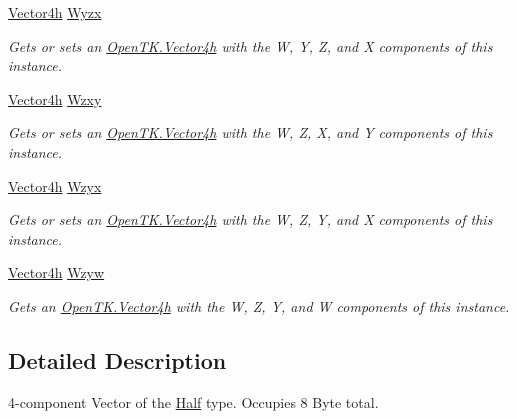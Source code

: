 \begin{DoxyCompactItemize}
\hyperlink{struct_open_t_k_1_1_vector4h}{Vector4h} \hyperlink{struct_open_t_k_1_1_vector4h_a5cd2ba9a5b9fa265e988c7e1f6c35001}{Wyzx}
\begin{DoxyCompactList}\small\item\em Gets or sets an \hyperlink{struct_open_t_k_1_1_vector4h}{Open\-T\-K.\-Vector4h} with the W, Y, Z, and X components of this instance. \end{DoxyCompactList}\item 
\hyperlink{struct_open_t_k_1_1_vector4h}{Vector4h} \hyperlink{struct_open_t_k_1_1_vector4h_a8472c7913c7dc5898156ffa729b7cf49}{Wzxy}
\begin{DoxyCompactList}\small\item\em Gets or sets an \hyperlink{struct_open_t_k_1_1_vector4h}{Open\-T\-K.\-Vector4h} with the W, Z, X, and Y components of this instance. \end{DoxyCompactList}\item 
\hyperlink{struct_open_t_k_1_1_vector4h}{Vector4h} \hyperlink{struct_open_t_k_1_1_vector4h_af530b17e506fad0d870501eab6da283e}{Wzyx}
\begin{DoxyCompactList}\small\item\em Gets or sets an \hyperlink{struct_open_t_k_1_1_vector4h}{Open\-T\-K.\-Vector4h} with the W, Z, Y, and X components of this instance. \end{DoxyCompactList}\item 
\hyperlink{struct_open_t_k_1_1_vector4h}{Vector4h} \hyperlink{struct_open_t_k_1_1_vector4h_ae637bf66627c2d29eb099846a597e9a3}{Wzyw}
\begin{DoxyCompactList}\small\item\em Gets an \hyperlink{struct_open_t_k_1_1_vector4h}{Open\-T\-K.\-Vector4h} with the W, Z, Y, and W components of this instance. \end{DoxyCompactList}\end{DoxyCompactItemize}


\subsection{Detailed Description}
4-\/component Vector of the \hyperlink{struct_open_t_k_1_1_half}{Half} type. Occupies 8 Byte total. 



